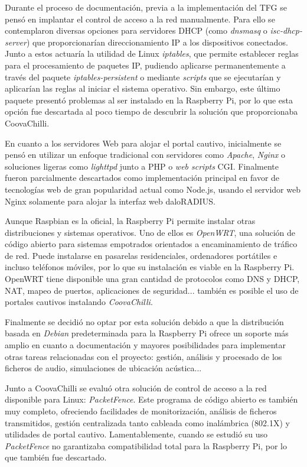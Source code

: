 \begin{appendices}
Durante el proceso de documentación, previa a la implementación del TFG se pensó en implantar el control de acceso a la red manualmente. Para ello se contemplaron diversas opciones para servidores DHCP (como \emph{dnsmasq} o \emph{isc-dhcp-server}) que proporcionarían direccionamiento IP a los dispositivos conectados. Junto a estos actuaría la utilidad de Linux \emph{iptables}, que permite establecer reglas para el procesamiento de paquetes IP, pudiendo aplicarse permanentemente a través del paquete \emph{iptables-persistent} o mediante \emph{scripts} que se ejecutarían y aplicarían las reglas al iniciar el sistema operativo. Sin embargo, este último paquete presentó problemas al ser instalado en la Raspberry Pi, por lo que esta opción fue descartada al poco tiempo de descubrir la solución que proporcionaba CoovaChilli.

En cuanto a los servidores Web para alojar el portal cautivo, inicialmente se pensó en utilizar un enfoque tradicional con servidores como \emph{Apache}, \emph{Nginx} o soluciones ligeras como \emph{lighttpd} junto a PHP o \emph{web scripts} CGI. Finalmente fueron parcialmente descartados como implementación principal en favor de tecnologías web de gran popularidad actual como Node.js, usando el servidor web Nginx solamente para alojar la interfaz web daloRADIUS.

Aunque Raspbian es la oficial, la Raspberry Pi permite instalar otras distribuciones y sistemas operativos. Uno de ellos es \emph{OpenWRT}, una solución de código abierto para sistemas empotrados orientados a encaminamiento de tráfico de red. Puede instalarse en pasarelas residenciales, ordenadores portátiles e incluso teléfonos móviles, por lo que su instalación es viable en la Raspberry Pi. OpenWRT tiene disponible una gran cantidad de protocolos como DNS y DHCP, \acrshort{NAT}, mapeo de puertos, aplicaciones de seguridad... también es posible el uso de portales cautivos instalando \emph{CoovaChilli}.

Finalmente se decidió no optar por esta solución debido a que la distribución basada en \emph{Debian} predeterminada para la Raspberry Pi ofrece un soporte más amplio en cuanto a documentación y mayores posibilidades para implementar otras tareas relacionadas con el proyecto: gestión, análisis y procesado de los ficheros de audio, simulaciones de ubicación acústica...

Junto a CoovaChilli se evaluó otra solución de control de acceso a la red disponible para Linux: \emph{PacketFence}. Este programa de código abierto es también muy completo, ofreciendo facilidades de monitorización, análisis de ficheros transmitidos, gestión centralizada tanto cableada como inalámbrica (802.1X) y utilidades de portal cautivo. Lamentablemente, cuando se estudió su uso \emph{PacketFence} no garantizaba compatibilidad total para la Raspberry Pi, por lo que también fue descartado.


\end{appendices}
